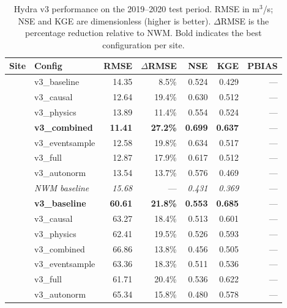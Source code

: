 \documentclass[draft]{agujournal2019}
\begin{document}
\begin{table}
    \centering
    \caption{Hydra v3 performance on the 2019--2020 test period. RMSE in m$^3$/s; NSE and KGE are dimensionless (higher is better). $\Delta$RMSE is the percentage reduction relative to NWM. Bold indicates the best configuration per site.}
    \small
    \begin{tabular}{ll rr rr r}
        \toprule
        \textbf{Site} & \textbf{Config} & \textbf{RMSE} & \textbf{$\Delta$RMSE} & \textbf{NSE} & \textbf{KGE} & \textbf{PBIAS} \\
        \midrule
            & v3\_baseline & 14.35 & 8.5\% & 0.524 & 0.429 & --- \\
            & v3\_causal & 12.64 & 19.4\% & 0.630 & 0.512 & --- \\
            & v3\_physics & 13.89 & 11.4\% & 0.554 & 0.524 & --- \\
            & \textbf{v3\_combined} & \textbf{11.41} & \textbf{27.2\%} & \textbf{0.699} & \textbf{0.637} & --- \\
            & v3\_eventsample & 12.58 & 19.8\% & 0.634 & 0.517 & --- \\
            & v3\_full & 12.87 & 17.9\% & 0.617 & 0.512 & --- \\
            & v3\_autonorm & 13.54 & 13.7\% & 0.576 & 0.469 & --- \\
            & \textit{NWM baseline} & \textit{15.68} & --- & \textit{0.431} & \textit{0.369} & --- \\
        \midrule
            & \textbf{v3\_baseline} & \textbf{60.61} & \textbf{21.8\%} & \textbf{0.553} & \textbf{0.685} & --- \\
            & v3\_causal & 63.27 & 18.4\% & 0.513 & 0.601 & --- \\
            & v3\_physics & 62.41 & 19.5\% & 0.526 & 0.593 & --- \\
            & v3\_combined & 66.86 & 13.8\% & 0.456 & 0.505 & --- \\
            & v3\_eventsample & 63.36 & 18.3\% & 0.511 & 0.536 & --- \\
            & v3\_full & 61.71 & 20.4\% & 0.536 & 0.622 & --- \\
            & v3\_autonorm & 65.34 & 15.8\% & 0.480 & 0.578 & --- \\

\end{tabular}
\end{table}
\end{document}
